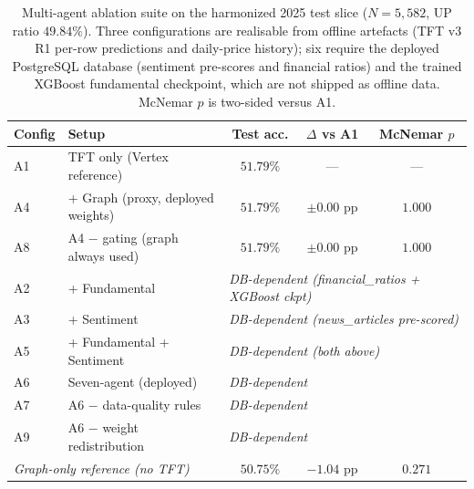 \documentclass[conference]{IEEEtran}
\begin{document}
\begin{table}[htbp]
\centering
\caption{Multi-agent ablation suite on the harmonized 2025 test slice ($N=5{,}582$, UP ratio $49.84\%$). Three configurations are realisable from offline artefacts (TFT v3 R1 per-row predictions and daily-price history); six require the deployed PostgreSQL database (sentiment pre-scores and financial ratios) and the trained XGBoost fundamental checkpoint, which are not shipped as offline data. McNemar $p$ is two-sided versus A1.}
\label{tab:multiagent_ablation}
\scriptsize
\setlength{\tabcolsep}{4pt}
\begin{tabular}{llccc}
\toprule
\textbf{Config} & \textbf{Setup} & \textbf{Test acc.} & \textbf{$\Delta$ vs A1} & \textbf{McNemar $p$} \\
\midrule
A1 & TFT only (Vertex reference)                        & $\mathbf{51.79\%}$ & ---             & ---       \\
A4 & + Graph (proxy, deployed weights)                  & $51.79\%$ & $\pm 0.00$ pp   & $1.000$   \\
A8 & A4 $-$ gating (graph always used)                  & $51.79\%$ & $\pm 0.00$ pp   & $1.000$   \\
\midrule
A2 & + Fundamental                                       & \multicolumn{3}{l}{\textit{DB-dependent (financial\_ratios + XGBoost ckpt)}} \\
A3 & + Sentiment                                         & \multicolumn{3}{l}{\textit{DB-dependent (news\_articles pre-scored)}}        \\
A5 & + Fundamental + Sentiment                           & \multicolumn{3}{l}{\textit{DB-dependent (both above)}}                      \\
A6 & Seven-agent (deployed)                              & \multicolumn{3}{l}{\textit{DB-dependent}}                                  \\
A7 & A6 $-$ data-quality rules                           & \multicolumn{3}{l}{\textit{DB-dependent}}                                  \\
A9 & A6 $-$ weight redistribution                        & \multicolumn{3}{l}{\textit{DB-dependent}}                                  \\
\midrule
\multicolumn{2}{l}{\textit{Graph-only reference (no TFT)}} & $50.75\%$ & $-1.04$ pp & $0.271$   \\
\bottomrule
\end{tabular}
\normalsize
\end{table}
\end{document}
